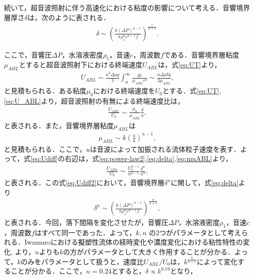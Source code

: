 続いて，超音波照射に伴う高速化における粘度の影響について考える．音響境界層厚さ$\delta$は，次のように表される．
\begin{eqnarray}
    \delta \sim \left(\frac{k\left(\Delta P\right)^{n-1}}{\pi \rho^n_1 c^{n-1} f}\right)^{\frac{1}{n+1}} .
    \label{eq:delta}
\end{eqnarray}

ここで，音響圧$\Delta P$，水溶液密度$\rho_1$，音速$c$，周波数$f$である．音響境界層粘度$\mu_{ABL}$とすると超音波照射下における終端速度$U_{ABL}$は，式\ref{eq:UT}より，
\begin{eqnarray}
    U_{ABL} \sim \frac{a^3\Delta\rho g}{3}  \int^{\infty}_{a} \frac{dr}{\mu_{ABL} r^2} \sim \frac{a\Delta \rho \delta g}{3\mu_{ABL}} ,
    \label{eq:U_ABL}
\end{eqnarray}
と見積もられる．ある粘度$\mu_0$における終端速度を$U_0$とする．式\ref{eq:UT},\ref{eq:U_ABL}より，超音波照射の有無による終端速度比は，
\begin{eqnarray}
    \frac{U_{ABL}}{U_0} \sim \frac{\mu_0}{\mu_{ABL}}\frac{\delta}{a} ,
    \label{eq:Udiff}
\end{eqnarray}
と表される．また，音響境界層粘度$\mu_{ABL}$は
\begin{eqnarray}
    \mu_{ABL} \sim k\left(\frac{u}{\delta}\right)^{n-1} ,
    \label{eq:muABL}
\end{eqnarray}
と見積もられる．ここで，$u$は音波によって加振される流体粒子速度を表す．よって，式\ref{eq:Udiff}の右辺は，式\ref{eq:power-law2},\ref{eq:delta},\ref{eq:muABL}より，
\begin{eqnarray}
    \frac{U_{ABL}}{U_0} \sim \frac{U_0^{n-1}}{u^{n-1}}\frac{\delta^n}{a^n} ,
    \label{eq:Udiff2}
\end{eqnarray}
と表される．この式\ref{eq:Udiff2}において，音響境界層$\delta^n$に関して，式\ref{eq:delta}より
\begin{eqnarray}
    \delta^n \sim \left(\frac{k\left(\Delta P\right)^{n-1}}{\pi \rho^n_1 c^{n-1} f}\right)^{\frac{n}{n+1}} ,
    \label{eq:ndelta}
\end{eqnarray}
と表される．今回，落下間隔を変化させたが，音響圧$\Delta P$，水溶液密度$\rho_1$，音速$c$，周波数$f$はすべて同一であった．よって，$k,n$ の2つがパラメータとして考えられる．Iwamuro\cite{ref:9}における擬塑性流体の経時変化や濃度変化における粘性特性の変化\cite{ref:Rahimi2007},\cite{ref:Agi2018} より，$n$よりも$k$の方がパラメータとして大きく作用することが分かる．よって，$k$のみをパラメータとして扱うと，速度比$U_{ABL}/U_0$は，$k^\frac{n}{n+1}$によって変化することが分かる．ここで，$n=0.24$とすると，$\delta \propto k^{0.19}$となり，








